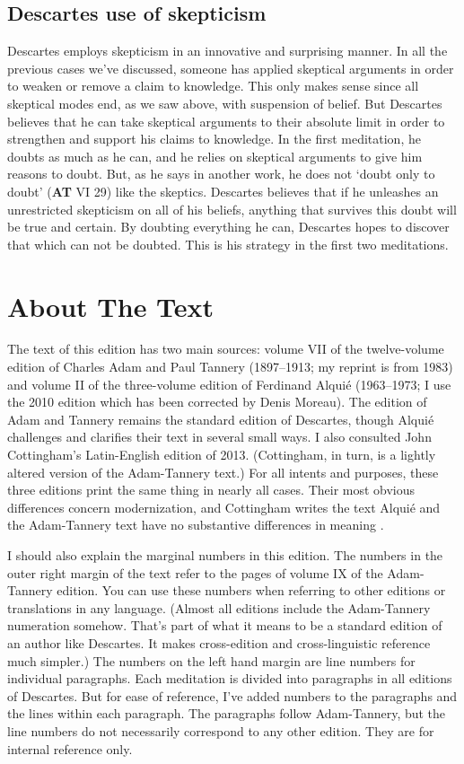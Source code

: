 \subsection*{Descartes use of skepticism}

Descartes employs skepticism in an innovative and surprising manner. In all the previous cases we've discussed, someone has applied skeptical arguments in order to weaken or remove a claim to knowledge. This only makes sense since all skeptical modes end, as we saw above, with suspension of belief. But Descartes believes that he can take skeptical arguments to their absolute limit in order to strengthen and support his claims to knowledge. In the first meditation, he doubts as much as he can, and he relies on skeptical arguments to give him reasons to doubt. But, as he says in another work, he does not `doubt only to doubt' (\textbf{AT} VI 29) like the skeptics. Descartes believes that if he unleashes an unrestricted skepticism on all of his beliefs, anything that survives this doubt will be true and certain. By doubting everything he can, Descartes hopes to discover that which can not be doubted. This is his strategy in the first two meditations.

\section*{About The Text}

The text of this edition has two main sources: volume VII of the twelve-volume edition of Charles Adam and Paul Tannery (1897--1913; my reprint is from 1983) and volume II of the three-volume edition of Ferdinand Alquié (1963--1973; I use the 2010 edition which has been corrected by Denis Moreau). The edition of Adam and Tannery remains the standard edition of Descartes, though Alquié challenges and clarifies their text in several small ways. I also consulted John Cottingham's Latin-English edition of 2013. (Cottingham, in turn, is a lightly altered version of the Adam-Tannery text.) For all intents and purposes, these three editions print the same thing in nearly all cases. Their most obvious differences concern modernization, and Cottingham writes the text Alquié and the Adam-Tannery text have no substantive differences in meaning \citet[xxxii, footnote 5]{cottingham2013}.

I should also explain the marginal numbers in this edition. The numbers in the outer right margin of the text refer to the pages of volume IX of the Adam-Tannery edition. You can use these numbers when referring to other editions or translations in any language. (Almost all editions include the Adam-Tannery numeration somehow. That's part of what it means to be a standard edition of an author like Descartes. It makes cross-edition and cross-linguistic reference much simpler.) The numbers on the left hand margin are line numbers for individual paragraphs. Each meditation is divided into paragraphs in all editions of Descartes. But for ease of reference, I've added numbers to the paragraphs and the lines within each paragraph. The paragraphs follow Adam-Tannery, but the line numbers do not necessarily correspond to any other edition. They are for internal reference only.

